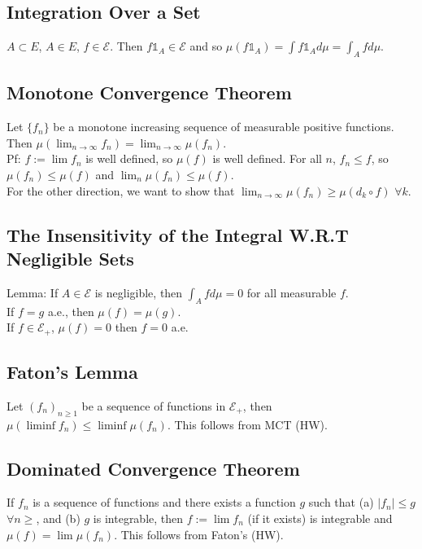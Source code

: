 \documentclass[english, 11pt]{article}
\begin{document}
\subsection{Integration Over a Set}
$A \subset E$, $A \in E$, $f \in \mathcal{E}$. Then $f \mathbb{1}_A \in \mathcal{E}$ and so $\mu(f \mathbb{1}_A) = \int f \mathbb{1}_A d\mu = \int_A f d\mu$.

\subsection{Monotone Convergence Theorem}

Let $\{f_n\}$ be a monotone increasing sequence of measurable positive functions. Then $\mu(\lim_{n \to \infty} f_n) = \lim_{n \to \infty} \mu(f_n)$.\\

Pf: $f := \lim f_n$ is well defined, so $\mu(f)$ is well defined. For all $n$, $f_n \leq f$, so $\mu(f_n) \leq \mu(f)$ and $\lim_n \mu(f_n) \leq \mu(f)$.\\

For the other direction, we want to show that $\lim_{n \to \infty} \mu(f_n) \geq \mu(d_k \circ f)$ $\forall k$.\\

\subsection{The Insensitivity of the Integral W.R.T Negligible Sets}
Lemma: If $A \in \mathcal{E}$ is negligible, then $\int_A f d\mu = 0$ for all measurable $f$.\\

If $f = g$ a.e., then $\mu(f) = \mu(g)$.\\

If $f \in \mathcal{E}_+$, $\mu(f) = 0$ then $f = 0$ a.e.\\

\subsection{Faton's Lemma}
Let $(f_n)_{n \geq 1}$ be a sequence of functions in $\mathcal{E}_+$, then $\mu(\liminf f_n) \leq \liminf \mu(f_n)$. This follows from MCT (HW).\\

\subsection{Dominated Convergence Theorem}
If $f_n$ is a sequence of functions and there exists a function $g$ such that (a) $|f_n| \leq g$ $\forall n \geq $, and (b) $g$ is integrable, then $f:= \lim f_n$ (if it exists) is integrable and $\mu(f) = \lim \mu(f_n)$. This follows from Faton's (HW).\\
\end{document}
